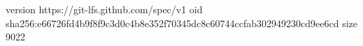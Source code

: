 version https://git-lfs.github.com/spec/v1
oid sha256:e66726fd4b9f8f9c3d0c4b8e352f70345dc8c60744ccfab302949230cd9ee6cd
size 9022
